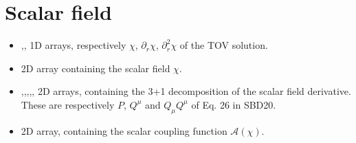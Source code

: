\documentclass[letterpaper,10pt,english]{sphinxmanual}
\begin{document}
\section{Scalar field}
\label{\detokenize{arrays:scalar-field}}\begin{itemize}
\item {} 
\sphinxAtStartPar
{},, \sphinxhyphen{} 1D arrays, respectively \(\chi\), \(\partial _r \chi\), \(\partial ^2 _r \chi\) of the TOV solution.


\item {} 
\sphinxAtStartPar
{} \sphinxhyphen{} 2D array containing the scalar field \(\chi\).


\item {} 
\sphinxAtStartPar
{},,,,, \sphinxhyphen{} 2D arrays, containing the 3+1 decomposition of the scalar field derivative. These are respectively \(P\), \(Q^\mu\) and \(Q_\mu Q^\mu\) of Eq. 26 in SBD20.


\item {} 
\sphinxAtStartPar
{} \sphinxhyphen{} 2D array, containing the scalar coupling function \(\mathcal{A}(\chi)\).

\end{itemize}
\end{document}
